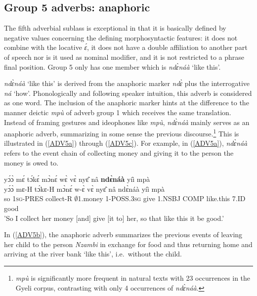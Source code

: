 \subsection{Group 5 adverbs: anaphoric} 
\label{sec:G5ADV}

The fifth adverbial sublass is exceptional in that it is basically defined by negative values concerning the defining morphosyntactic features: it does not combine with the locative {\itshape ɛ́}, it does not have a double affiliation to another part of speech nor is it used as nominal modifier, and it is not restricted to a phrase final position. Group 5 only has one member which is {\itshape ndɛ̀náà} `like this'.

{\itshape ndɛ̀náà} `like this' is derived from the anaphoric marker {\itshape ndɛ̀} plus the interrogative {\itshape ná} `how'. Phonologically and following speaker intuition, this adverb is considered as one word. The inclusion of the anaphoric marker hints at the difference to the manner deictic {\itshape mpù} of adverb group 1 which receives the same translation. Instead of framing gestures and ideophones like {\itshape mpù}, {\itshape ndɛ̀náà} mainly serves as an anaphoric adverb, summarizing in some sense the previous discourse.\footnote{{\itshape mpù} is significantly more frequent in natural texts with 23 occurrences in the Gyeli corpus, contrasting with only 4 occurrences of {\itshape ndɛ̀náà}.} This is illustrated in (\ref{ADV5a}) through (\ref{ADV5c}). For example, in (\ref{ADV5a}), {\itshape ndɛ̀náà} refers to the event chain of collecting money and giving it to the person the money is owed to. 

\begin{exe} 
\ex\label{ADV5a}
  \glll  yɔ́ɔ̀ mɛ́ tɔ́kɛ́ mɔ̀nɛ́ wɛ̀ vɛ̀ nyɛ̂ nâ {\bfseries ndɛ̀náà}  yíì mpà\\
        yɔ́ɔ̀ mɛ-H tɔ́kɛ-H mɔ̀nɛ́ w-ɛ̀ vɛ̀ nyɛ̂ nâ ndɛ̀náà  yíì mpà  \\
         so 1\textsc{sg}-PRES collect-R $\emptyset$1.money 1-POSS.3\textsc{sg} give 1.NSBJ COMP like.this 7.ID good \\
    \trans 'So I collect her money [and] give [it to] her, so that like this it be good.'
\end{exe}

\noindent In (\ref{ADV5b}), the anaphoric adverb summarizes the previous events of leaving her child to the person {\itshape Nzambi} in exchange for food and thus returning home and arriving at the river bank `like this', i.e.\ without the child. 

